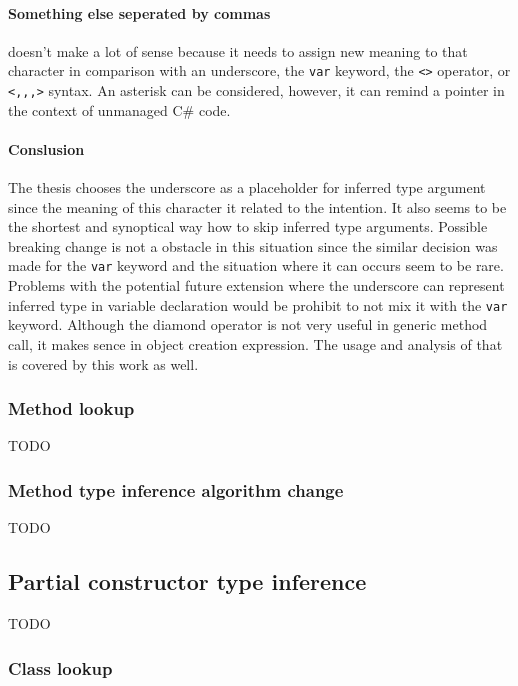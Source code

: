 \paragraph*{Something else seperated by commas} doesn't make a lot of sense because it needs to assign new meaning to that character in comparison with an underscore, the \texttt{var} keyword, the \texttt{<>} operator, or \texttt{<,,,>} syntax. An asterisk can be considered, however, it can remind a pointer in the context of unmanaged C\# code.

\paragraph*{Conslusion} The thesis chooses the underscore as a placeholder for inferred type argument since the meaning of this character it related to the intention.
It also seems to be the shortest and synoptical way how to skip inferred type arguments.
Possible breaking change is not a obstacle in this situation since the similar decision was made for the \texttt{var} keyword and the situation where it can occurs seem to be rare.
Problems with the potential future extension where the underscore can represent inferred type in variable declaration would be prohibit to not mix it with the \texttt{var} keyword.
Although the diamond operator is not very useful in generic method call, it makes sence in object creation expression.
The usage and analysis of that is covered by this work as well.

\subsubsection{Method lookup}

TODO

\subsubsection{Method type inference algorithm change}

TODO

\subsection{Partial constructor type inference}

TODO

\subsubsection*{Class lookup}

